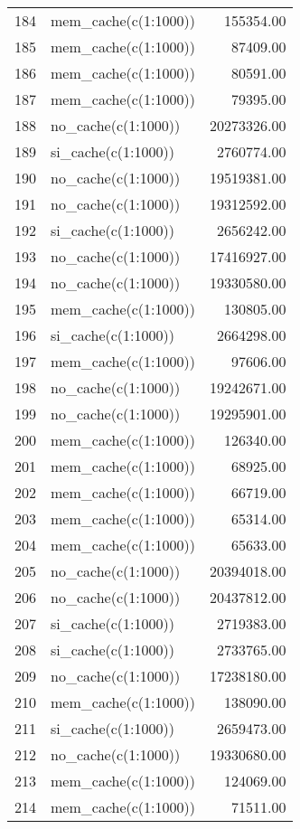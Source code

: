 \begin{table}[ht]
\begin{tabular}{rlr}
  184 & mem\_cache(c(1:1000)) & 155354.00 \\ 
  185 & mem\_cache(c(1:1000)) & 87409.00 \\ 
  186 & mem\_cache(c(1:1000)) & 80591.00 \\ 
  187 & mem\_cache(c(1:1000)) & 79395.00 \\ 
  188 & no\_cache(c(1:1000)) & 20273326.00 \\ 
  189 & si\_cache(c(1:1000)) & 2760774.00 \\ 
  190 & no\_cache(c(1:1000)) & 19519381.00 \\ 
  191 & no\_cache(c(1:1000)) & 19312592.00 \\ 
  192 & si\_cache(c(1:1000)) & 2656242.00 \\ 
  193 & no\_cache(c(1:1000)) & 17416927.00 \\ 
  194 & no\_cache(c(1:1000)) & 19330580.00 \\ 
  195 & mem\_cache(c(1:1000)) & 130805.00 \\ 
  196 & si\_cache(c(1:1000)) & 2664298.00 \\ 
  197 & mem\_cache(c(1:1000)) & 97606.00 \\ 
  198 & no\_cache(c(1:1000)) & 19242671.00 \\ 
  199 & no\_cache(c(1:1000)) & 19295901.00 \\ 
  200 & mem\_cache(c(1:1000)) & 126340.00 \\ 
  201 & mem\_cache(c(1:1000)) & 68925.00 \\ 
  202 & mem\_cache(c(1:1000)) & 66719.00 \\ 
  203 & mem\_cache(c(1:1000)) & 65314.00 \\ 
  204 & mem\_cache(c(1:1000)) & 65633.00 \\ 
  205 & no\_cache(c(1:1000)) & 20394018.00 \\ 
  206 & no\_cache(c(1:1000)) & 20437812.00 \\ 
  207 & si\_cache(c(1:1000)) & 2719383.00 \\ 
  208 & si\_cache(c(1:1000)) & 2733765.00 \\ 
  209 & no\_cache(c(1:1000)) & 17238180.00 \\ 
  210 & mem\_cache(c(1:1000)) & 138090.00 \\ 
  211 & si\_cache(c(1:1000)) & 2659473.00 \\ 
  212 & no\_cache(c(1:1000)) & 19330680.00 \\ 
  213 & mem\_cache(c(1:1000)) & 124069.00 \\ 
  214 & mem\_cache(c(1:1000)) & 71511.00 \\ 

\end{tabular}
\end{table}
